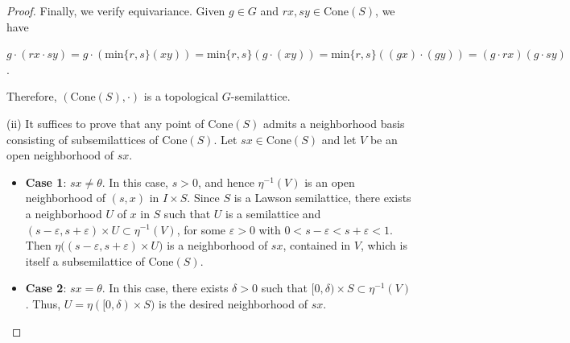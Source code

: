 \documentclass[10pt,a4paper]{amsart}
\begin{document}
\begin{proof}
		Finally, we verify equivariance. Given $g\in G$ and $rx,sy\in \mathrm{Cone}(S)$, we have
		
		\begin{center}
			$g\cdot (rx\cdot sy)=g\cdot (\mbox{min}\{r,s\}(xy))=\mbox{min}\{r,s\}(g\cdot (xy))=\mbox{min}\{r,s\}((gx)\cdot (gy))=(g\cdot rx)(g\cdot sy)$.
		\end{center}
		Therefore, $(\mathrm{Cone}(S),\cdot)$ is a topological $G$-semilattice.   
		
		(ii) It suffices to prove that any point of $\mathrm{Cone}(S)$ admits a neighborhood basis consisting of subsemilattices of $\mathrm{Cone}(S)$. Let $sx\in \mathrm{Cone}(S)$ and let $V$ be an open neighborhood of $sx$.
		
		\begin{itemize}
			\item \textbf{Case 1}: $sx\neq \theta$. In this case, $s > 0$, and hence $\eta^{-1}(V)$ is an open neighborhood of $(s,x)$ in $I\times S$. Since $S$ is a Lawson semilattice, there exists a neighborhood $U$ of $x$ in $S$ such that $U$ is a semilattice and $(s-\varepsilon,s+\varepsilon)\times U\subset \eta^{-1}(V)$, for some $\varepsilon>0$ with  $0<s-\varepsilon<s+\varepsilon<1$. Then $\eta\big((s-\varepsilon,s+\varepsilon)\times U\big)$ is a neighborhood of $sx$, contained in $V$, which is itself a subsemilattice of $\mathrm{Cone}(S)$.
			
			\item \textbf{Case 2}: $sx=\theta$. In this case, there exists $\delta>0$ such that $[0,\delta)\times S\subset \eta^{-1}(V)$. Thus, $U=\eta([0,\delta)\times S)$ is the desired neighborhood of $sx$.
		\end{itemize}
	\end{proof}
\end{document}
